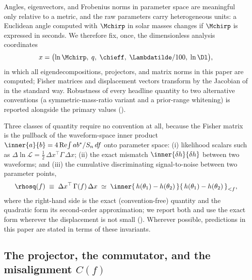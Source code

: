 Angles, eigenvectors, and Frobenius norms in parameter space are
meaningful only relative to a metric, and the raw parameters carry
heterogeneous units: a Euclidean angle computed with $\Mchirp$ in solar
masses changes if $\Mchirp$ is expressed in seconds. We therefore fix,
once, the dimensionless analysis coordinates
\begin{equation}
x = \bigl(\ln \Mchirp,\; q,\; \chieff,\; \Lambdatilde/100,\; \ln \Dl\bigr),
\label{eq:coords}
\end{equation}
in which all eigendecompositions, projectors, and matrix norms in this
paper are computed; Fisher matrices and displacement vectors transform
by the Jacobian of  in the standard way. Robustness of
every headline quantity to two alternative conventions (a
symmetric-mass-ratio variant and a prior-range whitening) is reported
alongside the primary values ().

Three classes of quantity require no convention at all, because the
Fisher matrix is the pullback of the waveform-space inner product
$\inner{a}{b} = 4\,\mathrm{Re}\!\int a b^{*}/S_n\,df$ onto parameter
space: (i) likelihood scalars such as
$\Delta\ln\mathcal{L} = \tfrac12\,\Delta x^{\top}\Gamma\,\Delta x$;
(ii) the exact mismatch
$\inner{\delta h}{\delta h}$ between two waveforms; and (iii) the
cumulative discriminating signal-to-noise between two parameter points,
\begin{equation}
\rhosq(f) \;\equiv\; \Delta x^{\top}\,\Gamma(f)\,\Delta x
\;\simeq\; \inner{\,h(\theta_1)-h(\theta_2)\,}{\,h(\theta_1)-h(\theta_2)\,}_{<f},
\label{eq:rhosq}
\end{equation}
where the right-hand side is the exact (convention-free) quantity and
the quadratic form its second-order approximation; we report both and
use the exact form wherever the displacement is not small
(). Wherever possible, predictions in this paper are
stated in terms of these invariants.

\subsection{The projector, the commutator, and the misalignment $C(f)$}
\label{sec:commutator}

